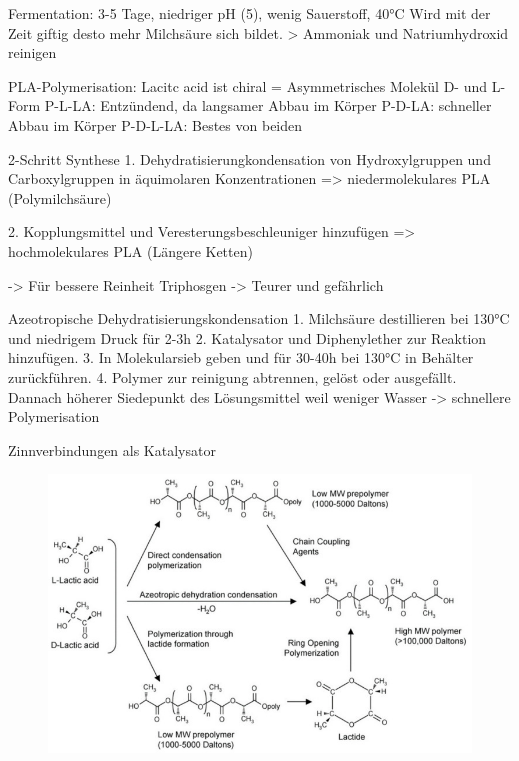 \documentclass[10pt]{article}
\begin{document}
    Fermentation:
    3-5 Tage, niedriger pH (5), wenig Sauerstoff, 40°C
    Wird mit der Zeit giftig desto mehr Milchsäure sich bildet.
    > Ammoniak und Natriumhydroxid reinigen

    \begin{figure}[H]
        \centering
        \qquad
    \end{figure}

    PLA-Polymerisation:
    Lacitc acid ist chiral = Asymmetrisches Molekül
    D- und L-Form
    P-L-LA: Entzündend, da langsamer Abbau im Körper
    P-D-LA: schneller Abbau im Körper
    P-D-L-LA: Bestes von beiden

    2-Schritt Synthese
    1. Dehydratisierungkondensation von Hydroxylgruppen und Carboxylgruppen in äquimolaren Konzentrationen
    => niedermolekulares PLA (Polymilchsäure)

    2. Kopplungsmittel und Veresterungsbeschleuniger hinzufügen
    => hochmolekulares PLA (Längere Ketten)

    -> Für bessere Reinheit Triphosgen
        -> Teurer und gefährlich

    Azeotropische Dehydratisierungskondensation
    1. Milchsäure destillieren bei 130°C und niedrigem Druck für 2-3h
    2. Katalysator und Diphenylether zur Reaktion hinzufügen.
    3. In Molekularsieb geben und für 30-40h bei 130°C in Behälter zurückführen.
    4. Polymer zur reinigung abtrennen, gelöst oder ausgefällt. Dannach höherer Siedepunkt des Lösungsmittel weil weniger Wasser -> schnellere Polymerisation

    Zinnverbindungen als Katalysator

    \begin{figure}[H]
        \centering
        \includegraphics{img/PLA_synthese}
    \end{figure}
\end{document}
